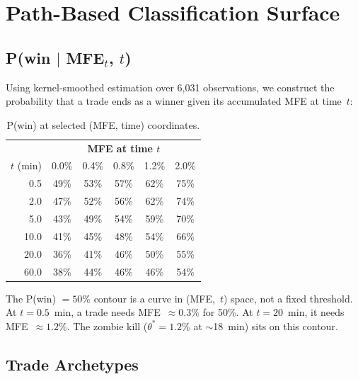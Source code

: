 \documentclass[11pt,a4paper]{article}
\begin{document}
\section{Path-Based Classification Surface}
\label{sec:pathclass}

\subsection{P(win $|$ MFE$_t$, $t$)}

Using kernel-smoothed estimation over 6,031 observations, we construct the probability that a trade ends as a winner given its accumulated MFE at time~$t$:

\begin{table}[H]
\centering
\caption{P(win) at selected (MFE, time) coordinates.}
\begin{tabular}{r|ccccc}
\toprule
& \multicolumn{5}{c}{\textbf{MFE at time $t$}} \\
$t$ (min) & 0.0\% & 0.4\% & 0.8\% & 1.2\% & 2.0\% \\
\midrule
0.5 & 49\% & 53\% & 57\% & 62\% & 75\% \\
2.0 & 47\% & 52\% & 56\% & 62\% & 74\% \\
5.0 & 43\% & 49\% & 54\% & 59\% & 70\% \\
10.0 & 41\% & 45\% & 48\% & 54\% & 66\% \\
20.0 & 36\% & 41\% & 46\% & 50\% & 55\% \\
60.0 & 38\% & 44\% & 46\% & 46\% & 54\% \\
\bottomrule
\end{tabular}
\end{table}

The P(win) $= 50\%$ contour is a curve in (MFE,~$t$) space, not a fixed threshold. At $t = 0.5$~min, a trade needs MFE~$\approx 0.3\%$ for 50\%. At $t = 20$~min, it needs MFE~$\approx 1.2\%$. The zombie kill ($\theta^* = 1.2\%$ at $\sim$18~min) sits on this contour.

\subsection{Trade Archetypes}
\end{document}
